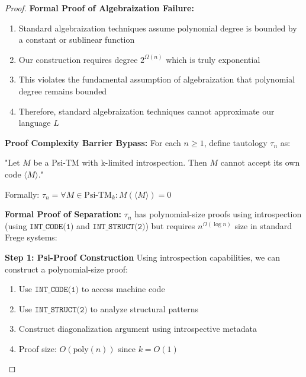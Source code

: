 \documentclass[11pt]{article}
\begin{document}
\begin{proof}
\textbf{Formal Proof of Algebraization Failure:}
\begin{enumerate}
\item Standard algebraization techniques assume polynomial degree is bounded by a constant or sublinear function
\item Our construction requires degree $2^{\Omega(n)}$ which is truly exponential
\item This violates the fundamental assumption of algebraization that polynomial degree remains bounded
\item Therefore, standard algebraization techniques cannot approximate our language $L$
\end{enumerate}

\textbf{Proof Complexity Barrier Bypass:}
For each $n \geq 1$, define tautology $\tau_n$ as:

"Let $M$ be a Psi-TM with k-limited introspection. Then $M$ cannot accept its own code $\langle M \rangle$."

Formally: $\tau_n = \forall M \in \text{Psi-TM}_k: M(\langle M \rangle) = 0$

\textbf{Formal Proof of Separation:}
$\tau_n$ has polynomial-size proofs using introspection (using $\texttt{INT\_CODE(1)}$ and $\texttt{INT\_STRUCT(2)}$) but requires $n^{\Omega(\log n)}$ size in standard Frege systems:

\textbf{Step 1: Psi-Proof Construction}
Using introspection capabilities, we can construct a polynomial-size proof:
\begin{enumerate}
\item Use $\texttt{INT\_CODE(1)}$ to access machine code
\item Use $\texttt{INT\_STRUCT(2)}$ to analyze structural patterns
\item Construct diagonalization argument using introspective metadata
\item Proof size: $O(\text{poly}(n))$ since $k = O(1)$
\end{enumerate}


\end{proof}
\end{document}
